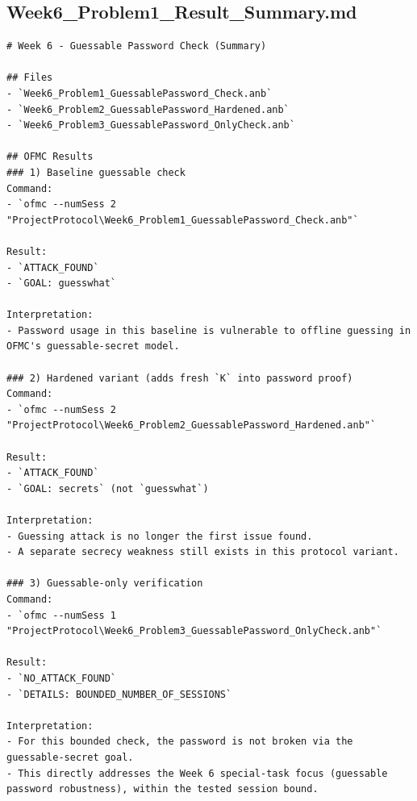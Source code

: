 \documentclass[11pt,a4paper]{article}
\begin{document}
\subsection{Week6\_Problem1\_Result\_Summary.md}
\begin{lstlisting}
# Week 6 - Guessable Password Check (Summary)

## Files
- `Week6_Problem1_GuessablePassword_Check.anb`
- `Week6_Problem2_GuessablePassword_Hardened.anb`
- `Week6_Problem3_GuessablePassword_OnlyCheck.anb`

## OFMC Results
### 1) Baseline guessable check
Command:
- `ofmc --numSess 2 "ProjectProtocol\Week6_Problem1_GuessablePassword_Check.anb"`

Result:
- `ATTACK_FOUND`
- `GOAL: guesswhat`

Interpretation:
- Password usage in this baseline is vulnerable to offline guessing in OFMC's guessable-secret model.

### 2) Hardened variant (adds fresh `K` into password proof)
Command:
- `ofmc --numSess 2 "ProjectProtocol\Week6_Problem2_GuessablePassword_Hardened.anb"`

Result:
- `ATTACK_FOUND`
- `GOAL: secrets` (not `guesswhat`)

Interpretation:
- Guessing attack is no longer the first issue found.
- A separate secrecy weakness still exists in this protocol variant.

### 3) Guessable-only verification
Command:
- `ofmc --numSess 1 "ProjectProtocol\Week6_Problem3_GuessablePassword_OnlyCheck.anb"`

Result:
- `NO_ATTACK_FOUND`
- `DETAILS: BOUNDED_NUMBER_OF_SESSIONS`

Interpretation:
- For this bounded check, the password is not broken via the guessable-secret goal.
- This directly addresses the Week 6 special-task focus (guessable password robustness), within the tested session bound.
\end{lstlisting}
\end{document}
